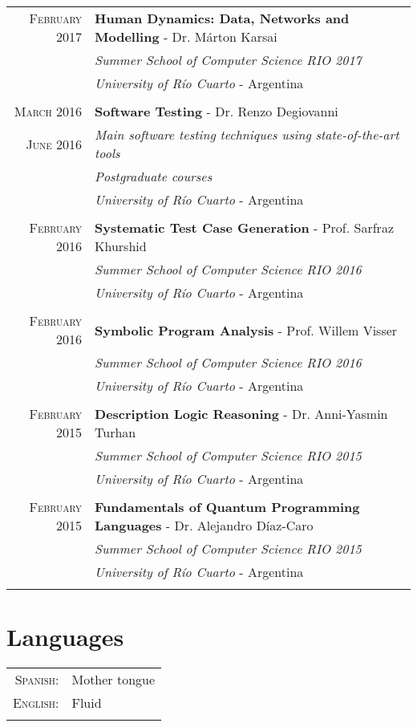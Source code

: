 \documentclass[a4paper,10pt]{article} %
\begin{document}
\begin{longtable}{rl}
\textsc{February} 2017 & \textbf{Human Dynamics: Data, Networks and Modelling} - Dr. Márton Karsai \\
& \textit{Summer School of Computer Science RIO 2017} \\
& \textit{University of Río Cuarto} - Argentina \\ & \\

\textsc{March} 2016 & \textbf{Software Testing} - Dr. Renzo Degiovanni \\
\textsc{June} 2016 & \textit{Main software testing techniques using state-of-the-art tools} \\
& \textit{Postgraduate courses} \\
& \textit{University of Río Cuarto} - Argentina \\ & \\

\textsc{February} 2016 & \textbf{Systematic Test Case Generation} - Prof. Sarfraz Khurshid \\
& \textit{Summer School of Computer Science RIO 2016} \\
& \textit{University of Río Cuarto} - Argentina \\ & \\

\textsc{February} 2016 & \textbf{Symbolic Program Analysis} - Prof. Willem Visser \\
& \textit{Summer School of Computer Science RIO 2016} \\
& \textit{University of Río Cuarto} - Argentina \\ & \\

\textsc{February} 2015 & \textbf{Description Logic Reasoning} - Dr. Anni-Yasmin Turhan\\
& \textit{Summer School of Computer Science RIO 2015} \\
& \textit{University of Río Cuarto} - Argentina \\ & \\

\textsc{February} 2015 & \textbf{Fundamentals of Quantum Programming Languages} - Dr. Alejandro Díaz-Caro \\
& \textit{Summer School of Computer Science RIO 2015} \\
& \textit{University of Río Cuarto} - Argentina \\ & \\

\end{longtable}

\section{Languages}
\begin{tabular}{rl}
\\
\textsc{Spanish:} & Mother tongue\\
\textsc{English:} & Fluid \\ & \\
\end{tabular}
\end{document}
